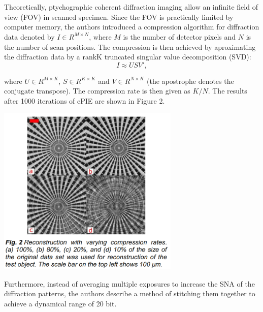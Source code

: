 \documentclass{article}
\begin{document}
\section{\cite{Loetgering_undated-wt} }

Theoretically, ptychographic coherent diffraction imaging allow an infinite field of view (FOV) in scanned specimen. Since the FOV is practically limited by computer memory, the authors introduced a compression algorithm for diffraction data denoted by $I \in R^{M\times N}$, where $M$ is the number of detector pixels and $N$ is the number of scan positions.
The compression is then achieved by aproximating the diffraction data by a rankK truncated singular value decomposition (SVD):
\begin{equation}
    I \approx USV',
\end{equation}

where $U \in R^{M \times K}$, $S \in R^{K \times K}$ and $V \in R^{N \times K}$ (the apostrophe denotes the conjugate transpose). The compression rate is then given as $K/ N$. The results after 1000 iterations of ePIE are shown in Figure 2.

\begin{center}
\includegraphics[width=0.65\textwidth]{figures/compression_ePIE.png}
\end{center}

Furthermore, instead of averaging multiple exposures to increase the SNA of the diffraction patterns, the authors describe a method of stitching them together to achieve a dynamical range of 20 bit.

\section{\cite{Loetgering2017-re} }
\end{document}
